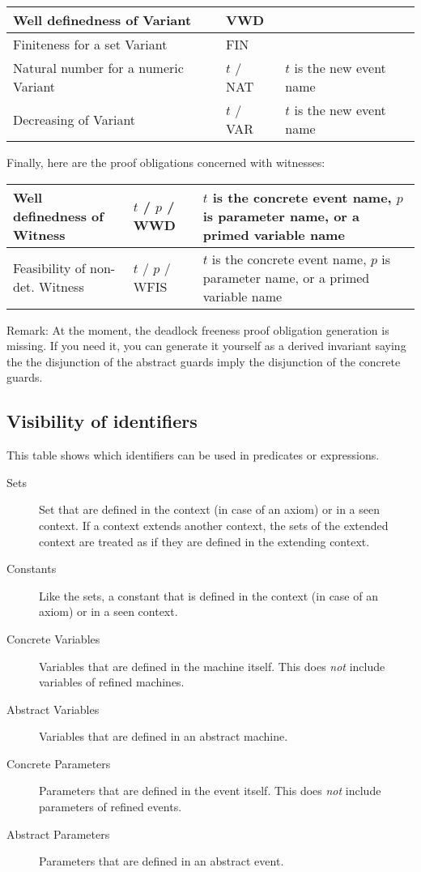 \begin{center}
    \begin{tabular}{| p{6cm} | p{3cm} | p{5cm} |}
    \hline
	Well definedness of Variant & VWD & \\ \hline
	Finiteness for a set Variant & FIN &  \\ \hline
	Natural number for a numeric Variant & $t$  / NAT & $t$ is the new event name \\ \hline
	Decreasing of Variant & $t$  / VAR & $t$ is the new event name  \\ \hline
    \end{tabular}
\end{center}

Finally, here are the proof obligations concerned with witnesses:

\begin{center}
    \begin{tabular}{| p{6cm} | p{3cm} | p{5cm} |}
    \hline
	Well definedness of Witness & $t$  / $p$  / WWD & $t$ is the concrete event name, $p$ is parameter name, or a primed variable name \\ \hline
	Feasibility of non-det. Witness & $t$  / $p$  / WFIS & $t$ is the concrete event name, $p$ is parameter name, or a primed variable name \\ \hline
    \end{tabular}
\end{center}

Remark: At the moment, the deadlock freeness proof obligation generation is missing. If you need it, you can generate it yourself as a derived invariant saying the the disjunction of the abstract guards imply the disjunction of the concrete guards.

\subsection{Visibility of identifiers}
\label{visibility_of_identifiers}

This table shows which identifiers can be used in predicates or expressions. 
\begin{description}
\item[Sets] Set that are defined in the context (in case of an axiom) or in a seen context.
  If a context extends another context, the sets of the extended context are treated as if they
  are defined in the extending context.
\item[Constants] Like the sets, a constant that is defined in the context (in case of an axiom) or
  in a seen context.
\item[Concrete Variables] Variables that are defined in the machine itself. This does \emph{not}
  include variables of refined machines.
\item[Abstract Variables] Variables that are defined in an abstract machine.
\item[Concrete Parameters] Parameters that are defined in the event itself. This does \emph{not}
  include parameters of refined events.
\item[Abstract Parameters] Parameters that are defined in an abstract event.
\end{description}

